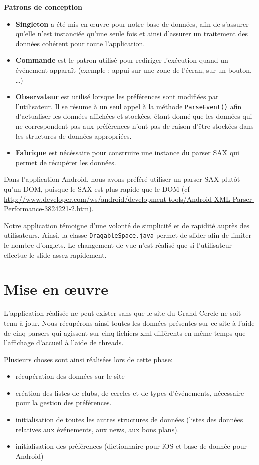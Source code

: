 \documentclass[a4paper, 11pt]{article}
\begin{document}
{\bf Patrons de conception}

\begin{itemize}
	\item {\bf Singleton} a été mis en œuvre pour notre base de données, afin de s'assurer qu'elle n'est instanciée qu'une seule fois et ainsi d'assurer un traitement des données cohérent pour toute l'application.\\
	\item {\bf Commande} est le patron utilisé pour rediriger l'exécution quand un événement apparaît (exemple : appui sur une zone de l'écran, sur un bouton, \dots)\\
	\item {\bf Observateur} est utilisé lorsque les préférences sont modifiées par l'utilisateur. Il se résume à un seul appel à la méthode \texttt{ParseEvent()} afin d'actualiser les données affichées et stockées, étant donné que les données qui ne correspondent pas aux préférences n'ont pas de raison d'être stockées dans les structures de données appropriées.
	\item {\bf Fabrique} est nécéssaire pour construire une instance du parser SAX qui permet de récupérer les données.
\end{itemize}
Dans l'application Android, nous avons préféré utiliser un parser SAX plutôt qu'un DOM, puisque le SAX est plus rapide que le DOM (cf \href{http://www.developer.com/ws/android/development-tools/Android-XML-Parser-Performance-3824221-2.htm}{http://www.developer.com/ws/android/development-tools/Android-XML-Parser-Performance-3824221-2.htm}).

Notre application témoigne d'une volonté de simplicité et de rapidité auprès des utilisateurs. Ainsi, la classe \texttt{DragableSpace.java} permet de \og slider \fg afin de limiter le nombre d'onglets. Le changement de vue n'est réalisé que si l'utilisateur effectue le slide assez rapidement.

\section{Mise en œuvre}

L'application réalisée ne peut exister sans que le site du Grand Cercle ne soit tenu à jour. Nous récupérons ainsi toutes les données présentes sur ce site à l'aide de cinq parsers qui agissent sur cinq fichiers xml différents en même temps que l'affichage d'accueil à l'aide de threads.

\noindent Plusieurs choses sont ainsi réalisées lors de cette phase:
\begin{itemize}
\item récupération des données sur le site
\item création des listes de clubs, de cercles et de types d'événements, nécessaire pour la gestion des préférences.
\item initialisation de toutes les autres structures de données (listes des données relatives aux événements, aux news, aux bons plans).
\item initialisation des préférences (dictionnaire pour iOS et base de donnée pour Android)
\end{itemize}
\end{document}

